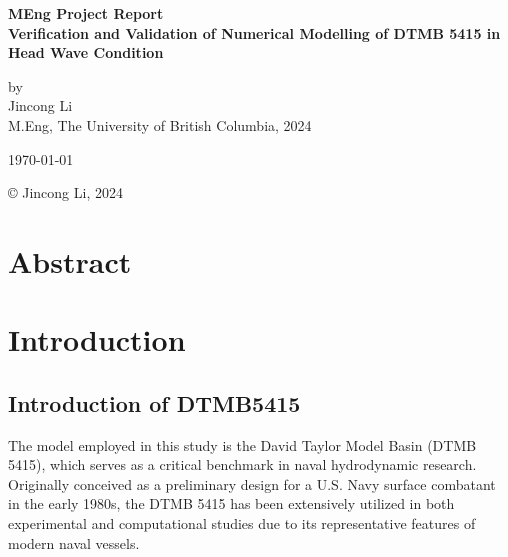 \documentclass[12pt]{article} %
\begin{document}
\setlength{\parskip}{1em} 
\setlength{\parindent}{0pt}
\newcommand{\vect}[1]{\mathbf{#1}}

\begin{titlepage}  %
    \centering    %

    \vspace*{2cm}
    
    \normalsize \textbf{MEng Project Report} \\
    \vspace{0.5cm}  %
    \normalsize\textbf{Verification and Validation of Numerical Modelling of DTMB 5415 in Head Wave Condition} \\
    \vspace{2cm}  %
    
    \normalsize by\\
    \vspace{1cm}
    \normalsize Jincong Li \\ 
    \vspace{1cm}
    \normalsize M.Eng, The University of British Columbia, 2024
    \vspace{11cm}  %
    
    \normalsize \today

    \vfill  %
    © Jincong Li, 2024
\end{titlepage}
\tableofcontents
\newpage
\section{Abstract}

\section{Introduction}

\subsection{Introduction of DTMB5415}

The model employed in this study is the David Taylor Model Basin (DTMB 5415), which serves as a 
critical benchmark in naval hydrodynamic research. Originally conceived as a preliminary design 
for a U.S. Navy surface combatant in the early 1980s, the DTMB 5415 has been extensively utilized 
in both experimental and computational studies due to its representative features of modern naval vessels.
\end{document}
